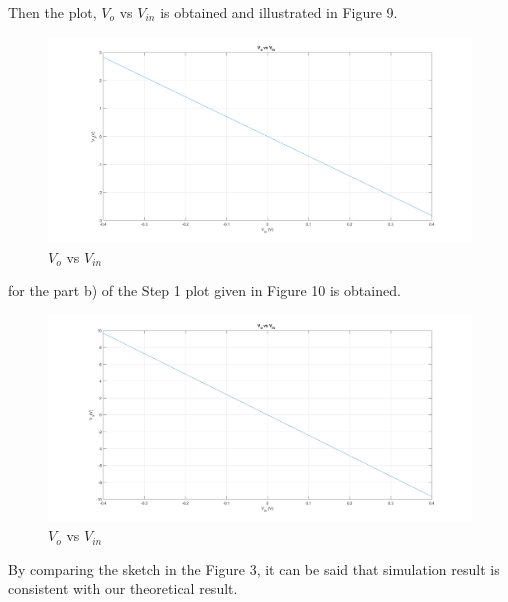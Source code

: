 \documentclass[letterpaper,12pt]{article}
\begin{document}
Then the plot, \(V_o\) vs \(V_{in}\) is obtained and illustrated in Figure 9.
\begin{figure}[H]
	\centering
   \includegraphics[width=1\textwidth]{Pre_1a.png}
   \caption{\(V_o\) vs \(V_{in}\)}
\end{figure} 
for the part b) of the Step 1 plot given in Figure 10 is obtained.
\begin{figure}[H]
	\centering
   \includegraphics[width=1\textwidth]{Pre_1b.png}
   \caption{\(V_o\) vs \(V_{in}\)}
\end{figure} 
 
By comparing the sketch in the Figure 3, it can be said that simulation result is consistent with our theoretical result.
\end{document}

